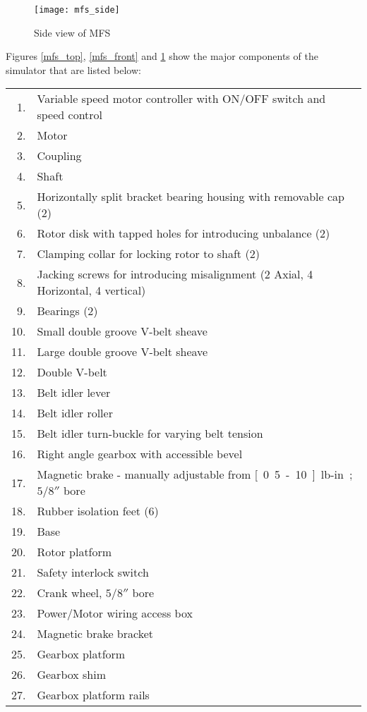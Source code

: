 \documentclass[a4paper,11pt]{report}
\begin{document}
\begin{figure}[b] 
\centering
\texttt{[image: mfs\_side]}
\caption{Side view of MFS} \label{mfs_side}
\end{figure} 

\clearpage
Figures \ref{mfs_top}, \ref{mfs_front} and \ref{mfs_side} show the major components of the simulator that are listed below:\\ 

\begin{tabular}{rl}
1. & Variable speed motor controller with ON/OFF switch and speed control \\
2. & Motor\\
3. & Coupling \\
4. & Shaft \\
5. & Horizontally split bracket bearing housing with removable cap (2)\\
6. & Rotor disk with tapped holes for introducing unbalance (2)\\
7. & Clamping collar for locking rotor to shaft (2)\\
8. & Jacking screws for introducing misalignment (2 Axial, 4 Horizontal, 4 vertical) \\
9. & Bearings (2)\\
10. & Small double groove V-belt sheave\\
11. & Large double groove V-belt sheave\\
12. & Double V-belt\\
13. & Belt idler lever\\
14. & Belt idler roller\\
15. & Belt idler turn-buckle for varying belt tension\\
16. & Right angle gearbox with accessible bevel\\
17. & Magnetic brake - manually adjustable from \unit[0.5-10]{lb-in}; $5/8''$ bore \\
18. & Rubber isolation feet (6)\\
19. & Base\\
20. & Rotor platform \\
21. & Safety interlock switch\\
22. & Crank wheel, $5/8''$ bore\\
23. & Power/Motor wiring access box\\
24. & Magnetic brake bracket\\
25. & Gearbox platform\\
26. & Gearbox shim\\
27. & Gearbox platform rails\\

\end{tabular}
\end{document}
